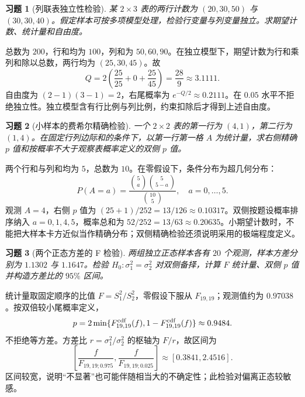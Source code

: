 \documentclass[UTF8,12pt,a4paper,fontset=fandol]{ctexart}
\newtheorem{exercise}{习题}[section]
\begin{document}
\begin{exercise}[列联表独立性检验]\label{q:B15.3}
某 $2\times3$ 表的两行计数为 $(20,30,50)$ 与 $(30,30,40)$。假定样本可按多项模型处理，检验行变量与列变量独立。求期望计数、统计量和自由度。\par{}
\end{exercise}

\begin{solve}\label{a:B15.3}总数为 $200$，行和均为 $100$，列和为 $50,60,90$。在独立模型下，期望计数为行和乘列和除以总数，两行均为 $(25,30,45)$。故\[Q=2\left(\frac{25}{25}+0+\frac{25}{45}\right)=\frac{28}{9}\approx3.1111.\]自由度为 $(2-1)(3-1)=2$，右尾概率为 $e^{-Q/2}\approx0.2111$。在 $0.05$ 水平不拒绝独立性。独立模型含有行比例与列比例，约束扣除后才得到上述自由度。\end{solve}

\begin{exercise}[小样本的费希尔精确检验]\label{q:B15.4}
一个 $2\times2$ 表的第一行为 $(4,1)$，第二行为 $(1,4)$。在固定行列边际和的条件下，以第一行第一格 $A$ 为统计量，求右侧精确 $p$ 值和按概率不大于观察表概率定义的双侧 $p$ 值。\par{}
\end{exercise}

\begin{solve}\label{a:B15.4}两个行和与列和均为 $5$，总数为 $10$。在零假设下，条件分布为超几何分布：\[P(A=a)=\frac{\binom5a\binom5{5-a}}{\binom{10}5},\quad a=0,\ldots,5.\]观测 $A=4$，右侧 $p$ 值为 $(25+1)/252=13/126\approx0.10317$。双侧按题设概率排序纳入 $a=0,1,4,5$，概率总和为 $52/252=13/63\approx0.20635$。小期望计数时，不能把大样本卡方近似当作精确分布；双侧精确检验还须说明采用的极端程度定义。\end{solve}

\begin{exercise}[两个正态方差的 F 检验]\label{q:M-P9-5}
两组独立正态样本各有 $20$ 个观测，样本方差分别为 $1.1302$ 与 $1.1647$。检验 $H_0:\sigma_1^2=\sigma_2^2$ 对双侧备择，计算 $F$ 统计量、双侧 $p$ 值并构造方差比的 $95\%$ 区间。\par{}
\end{exercise}

\begin{solve}\label{a:M-P9-5}统计量取固定顺序的比值 $F=S_1^2/S_2^2$，零假设下服从 $F_{19,19}$；观测值约为 $0.97038$。按双倍较小尾概率定义，\[p=2\min\{F_{19,19}^{\rm cdf}(f),1-F_{19,19}^{\rm cdf}(f)\}\approx0.9484.\]不拒绝等方差。方差比 $r=\sigma_1^2/\sigma_2^2$ 的枢轴为 $F/r$，故区间为\[\left[\frac{f}{F_{19,19;0.975}},\frac{f}{F_{19,19;0.025}}\right]\approx[0.3841,2.4516].\]区间较宽，说明“不显著”也可能伴随相当大的不确定性；此检验对偏离正态较敏感。\end{solve}
\end{document}
